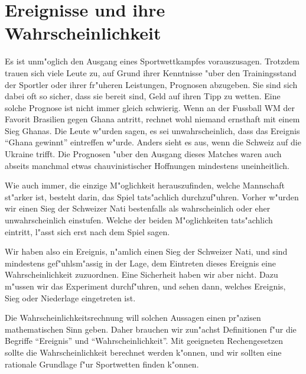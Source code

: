 %
%
%
\chapter{Ereignisse und ihre Wahrscheinlichkeit} \label{chapter-ereignisse-und-wahrscheinlichkeit}

Es ist unm"oglich den Ausgang eines Sportwettkampfes vorauszusagen.
Trotzdem trauen sich viele Leute zu, auf Grund ihrer Kenntnisse "uber den
Trainingsstand der Sportler oder ihrer fr"uheren Leistungen,
Prognosen abzugeben.
Sie sind sich dabei oft so sicher, dass sie bereit sind, Geld auf ihren Tipp
zu wetten.
Eine solche Prognose ist nicht immer gleich schwierig.
Wenn an der
Fussball WM der Favorit Brasilien gegen Ghana antritt,
rechnet wohl niemand ernsthaft mit einem Sieg Ghanas.
Die Leute w"urden
sagen, es sei unwahrscheinlich, dass das Ereignis ``Ghana gewinnt'' eintreffen
w"urde.
Anders sieht es aus, wenn die Schweiz auf die Ukraine trifft.
Die Prognosen "uber den Ausgang dieses Matches waren auch abseits
manchmal etwas chauvinistischer Hoffnungen mindestens uneinheitlich.

Wie auch immer, die einzige M"oglichkeit herauszufinden, welche Mannschaft
st"arker ist, besteht darin, das Spiel tats"achlich durchzuf"uhren.
Vorher w"urden wir einen Sieg der Schweizer Nati bestenfalls als
wahrscheinlich oder eher unwahrscheinlich einstufen.
Welche der beiden M"oglichkeiten tats"achlich eintritt, l"asst sich
erst nach dem Spiel sagen.

Wir haben also ein Ereignis, n"amlich einen Sieg der Schweizer Nati,
und sind mindestens gef"uhlsm"assig in der Lage, dem Eintreten dieses
Ereignis eine Wahrscheinlichkeit zuzuordnen.
Eine Sicherheit haben wir aber nicht.
Dazu m"ussen wir das Experiment durchf"uhren, und sehen dann,
welches Ereignis, Sieg oder Niederlage eingetreten ist.

Die Wahrscheinlichkeitsrechnung will solchen Aussagen einen pr"azisen
mathematischen Sinn geben.
Daher brauchen wir zun"achst Definitionen
f"ur die Begriffe ``Ereignis'' und ``Wahrscheinlichkeit''.
Mit geeigneten
Rechengesetzen sollte die Wahrscheinlichkeit berechnet werden k"onnen,
und wir sollten eine rationale Grundlage f"ur Sportwetten finden k"onnen.

